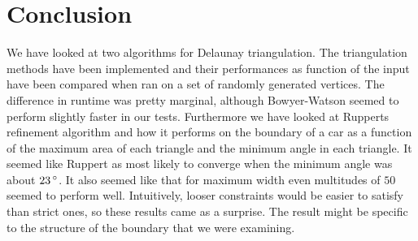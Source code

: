 \section{Conclusion}
\label{sec:conclusion}

We have looked at two algorithms for Delaunay triangulation. 
The triangulation methods have been implemented and their performances as function of the input have been compared when ran on a set of randomly generated vertices.
The difference in runtime was pretty marginal, although Bowyer-Watson seemed to perform slightly faster in our tests.
Furthermore we have looked at Rupperts refinement algorithm and how it performs on the boundary of a car as a function of the maximum area of each triangle and the minimum angle in each triangle.
It seemed like Ruppert as most likely to converge when the minimum angle was about $23\,^{\circ}$.
It also seemed like that for maximum width even multitudes of $50$ seemed to perform well.
Intuitively, looser constraints would be easier to satisfy than strict ones, so these results came as a surprise.
The result might be specific to the structure of the boundary that we were examining.
